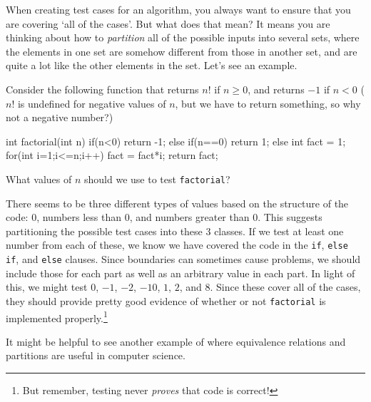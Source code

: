 When creating test cases for an algorithm, you always want to
ensure that you are covering `all of the cases'.  But what does that mean?  It means you are
thinking about how to {\em partition} all of the possible inputs into several sets, where 
the elements in one set are somehow different from those in another set, and are quite a lot
like the other elements in the set.  Let's see an example.

\begin{exa}\label{exa:factPart}
Consider the following function that returns $n!$ if $n\geq 0$, and returns $-1$ if $n<0$
($n!$ is undefined for negative values of $n$, but we have to return something, so why not a negative 
number?)
\begin{code}
	int factorial(int n) {
	    if(n<0)       { return -1; }
	    else if(n==0) { return 1; }
	    else {
	        int fact = 1;
	        for(int i=1;i<=n;i++) {
	            fact = fact*i;
	        }
	        return fact;
	    }
	}
\end{code}
What values of $n$ should we use to test \verb+factorial+?
\begin{sol}
There seems to be three different types of values based on the structure of the code: $0$,
numbers less than $0$, and numbers greater than $0$.  
This suggests partitioning the possible test cases into these
3 classes. If we test at least one number from each of these,
we know we have covered the code in the \verb+if+,
\verb+else if+, and \verb+else+ clauses. Since boundaries can sometimes cause problems, we should include those for each part
as well as an arbitrary value in each part.
In light of this, we might test $0$, $-1$, $-2$, $-10$, $1$, $2$, and $8$.
Since these cover all of the cases, they should provide pretty good evidence of whether
or not \verb+factorial+ is implemented properly.\footnote{But remember, testing never {\em proves}
that code is correct!}
\end{sol}
\end{exa}

It might be helpful to see another example of where equivalence relations and partitions are useful in computer science.

